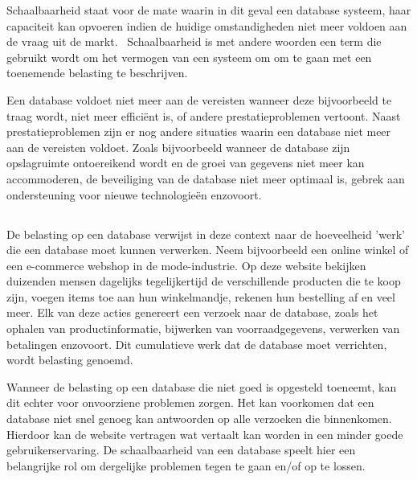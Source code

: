 Schaalbaarheid staat voor de mate waarin in dit geval een database systeem, haar capaciteit kan opvoeren indien de huidige omstandigheden niet meer voldoen aan de vraag uit de markt.~\autocite{Encyclo.nl} Schaalbaarheid is met andere woorden een term die gebruikt wordt om het vermogen van een systeem om om te gaan met een toenemende belasting te beschrijven.

Een database voldoet niet meer aan de vereisten wanneer deze bijvoorbeeld te traag wordt, niet meer efficiënt is, of andere prestatieproblemen vertoont. Naast prestatieproblemen zijn er nog andere situaties waarin een database niet meer aan de vereisten voldoet. Zoals bijvoorbeeld wanneer de database zijn opslagruimte ontoereikend wordt en de groei van gegevens niet meer kan accommoderen, de beveiliging van de database niet meer optimaal is, gebrek aan ondersteuning voor nieuwe technologieën enzovoort.

\subsection{}%
\label{subsec:workload}

De belasting op een database verwijst in deze context naar de hoeveelheid 'werk' die een database moet kunnen verwerken. Neem bijvoorbeeld een online winkel of een e-commerce webshop in de mode-industrie. Op deze website bekijken duizenden mensen dagelijks tegelijkertijd de verschillende producten die te koop zijn, voegen items toe aan hun winkelmandje, rekenen hun bestelling af en veel meer. Elk van deze acties genereert een verzoek naar de database, zoals het ophalen van productinformatie, bijwerken van voorraadgegevens, verwerken van betalingen enzovoort. Dit cumulatieve werk dat de database moet verrichten, wordt belasting genoemd.

Wanneer de belasting op een database die niet goed is opgesteld toeneemt, kan dit echter voor onvoorziene problemen zorgen. Het kan voorkomen dat een database niet snel genoeg kan antwoorden op alle verzoeken die binnenkomen. Hierdoor kan de website vertragen wat vertaalt kan worden in een minder goede gebruikerservaring. De schaalbaarheid van een database speelt hier een belangrijke rol om dergelijke problemen tegen te gaan en/of op te lossen.


\subsection{}%
\label{subsec:horizontale-en-verticale-schaalbaarheid}

